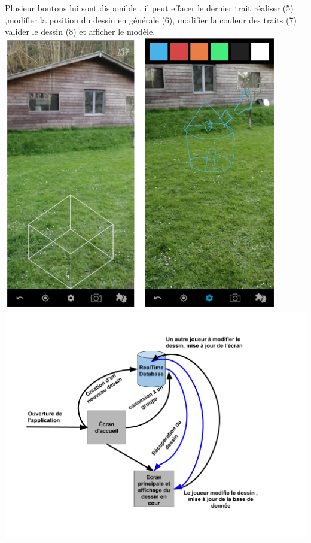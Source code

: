 \documentclass[12pt]{article}
\begin{document}
Plusieur boutons lui sont disponible , il peut effacer le dernier trait réaliser (5) ,modifier la position du dessin en générale (6), modifier la couleur des traits (7) valider le dessin (8) et afficher le modèle.
\newline
\includegraphics[width=0.9\textwidth]{Capture3.png}
\newline
\includegraphics[width=1\textwidth]{dessin2.png}
\end{document}
